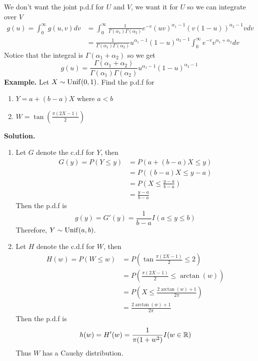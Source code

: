 \documentclass[openany]{report}
\begin{document}
    We don't want the joint p.d.f for $U$ and $V$, we want it for $U$ so we can integrate over $V$ 
    \begin{align*}
        g(u) = \int_0^\infty g(u,v)dv &= \int_0^\infty \frac{1}{\Gamma(\alpha_1)\Gamma(\alpha_2)}e^{-v}(uv)^{\alpha_1 - 1}(v(1-u))^{\alpha_2-1}vdv\\
        &= \frac{1}{\Gamma(\alpha_1)\Gamma(\alpha_2)}u^{\alpha_1 - 1}(1-u)^{\alpha_2-1}\int_0^\infty e^{-v}v^{\alpha_1 + \alpha_2}dv
    \end{align*}
    Notice that the integral is $\Gamma(\alpha_1 + \alpha_2)$ so we get 
    \[g(u) = \frac{\Gamma(\alpha_1 + \alpha_2)}{\Gamma(\alpha_1)\Gamma(\alpha_2)}u^{\alpha_1 - 1}(1-u)^{\alpha_2-1} \]
\noindent
    \textbf{Example.} Let $X \sim \operatorname{Unif}(0,1)$. Find the p.d.f for 
    \begin{enumerate}[label=(\roman*)]
        \item $Y = a+(b-a)X$ where $a < b$
        \item $W = \tan\left(\frac{\pi(2X-1)}{2}\right)$
    \end{enumerate}
    \textbf{Solution.} 
    \begin{enumerate}[label=(\roman*)]
        \item Let $G$ denote the c.d.f for $Y$, then 
        \begin{align*}
            G(y) = P(Y \leq y) &= P(a + (b-a)X \leq y)\\
            &= P((b-a)X \leq y - a)\\
            &= P\left(X \leq \frac{y-a}{b-a}\right)\\
            &= \frac{y-a}{b-a}   
        \end{align*}
        Then the p.d.f is 
        \[g(y) = G'(y) = \frac{1}{b-a}I(a \leq y \leq b)\]
        Therefore, $Y \sim \operatorname{Unif}(a,b)$.
        
        \item Let $H$ denote the c.d.f for $W$, then 
        \begin{align*}
            H(w) = P(W \leq w) &= P\left(\tan\frac{\pi(2X-1)}{2} \leq 2\right)\\
            &= P\left(\frac{\pi(2X-1)}{2} \leq \arctan(w)\right)\\
            &= P\left(X \leq \frac{2\arctan(w) + 1}{2\pi}\right)\\
            &= \frac{2\arctan(w) + 1}{2\pi}
        \end{align*}
    Then the p.d.f is 
    \[h(w) = H'(w) = \frac{1}{\pi(1+w^2)}I(w \in \mathbb{R})\]
    Thus $W$ has a Cauchy distribution.\\[2ex]
    \end{enumerate}
\end{document}
